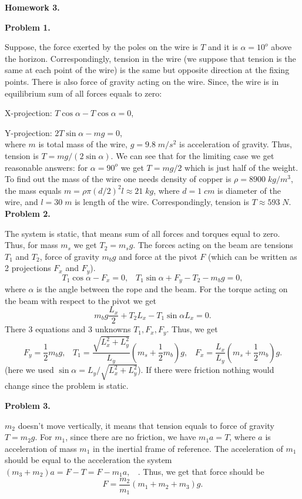 \documentclass[12pt]{article}
\begin{document}
\begin{center}
{\bf\large Homework 3.}
\end{center}

{\bf Problem 1.}

Suppose, the force exerted by the poles on the wire is $T$ and it is $\alpha=10^o$ above the horizon. Correspondingly, tension in the wire (we suppose that tension is the same at
each point of the wire) is the same but opposite direction at the fixing points. There is also force of gravity acting on the wire. Since, the wire is in equilibrium sum of all forces equals to zero:

X-projection: $T\cos\alpha-T\cos\alpha=0$,

Y-projection: $2T\sin\alpha-mg=0$,\\
where $m$ is total mass of the wire, $g=9.8\;m/s^2$ is acceleration of gravity.
Thus, tension is $T=mg/(2\sin\alpha)$. We can see that for the limiting case we get reasonable answers: for $\alpha=90^o$ we get $T=mg/2$ which is just half of the weight.
To find out the mass of the wire one needs density of copper is $\rho=8900\; kg/m^3$,
the mass equals $m=\rho \pi (d/2)^2 l\approx 21\;kg$, where $d=1\;cm$ is diameter of the wire, and $l=30\;m$ is length of the wire. Correspondingly, tension is $T\approx 593\;N$.
\\

{\bf Problem 2.}

The system is static, that means sum of all forces and torques equal to zero.
Thus, for mass $m_s$ we get $T_2=m_s g$.
The forces acting on the beam are tensions $T_1$ and $T_2$, force of gravity
$m_bg$ and force at the pivot $F$ (which can be written as 2 projections $F_x$ and $F_y$).
$$T_1 \cos\alpha -F_x=0,\;\;\; T_1 \sin\alpha+F_y-T_2-m_bg=0,$$
where $\alpha $ is the angle between the rope and  the beam.
For the torque acting on the beam with respect to the pivot we get
$$ m_b g \frac{L_x}{2} + T_2 L_x -T_1 \sin\alpha L_x=0.$$
There 3 equations and 3 unknowns $T_1, F_x, F_y$. Thus, we get 
$$F_y=\frac{1}{2}m_bg,\;\;\;T_1=\frac{\sqrt{L_x^2+L_y^2}}{L_y}(m_s+\frac{1}{2}m_b)g,\;\;\;F_x=\frac{L_x}{L_y}(m_s+\frac{1}{2}m_b)g.$$
(here we used $\sin\alpha=L_y/\sqrt{L_x^2+L_y^2}$). If there were friction nothing would
change since the problem is static.
\newpage

{\bf Problem 3.}

$m_2$ doesn't move vertically, it means that tension equals to force of gravity $T=m_2g$.
For $m_1$, since there are no friction, we have $m_1 a =T$, where $a$ is acceleration of mass $m_1$ in the inertial frame of reference. The acceleration of $m_1$ should be equal
to the acceleration the system $(m_3+m_2) a=F-T=F-m_1a,\;\;$ . Thus, we get that force should be
$$F=\frac{m_2}{m_1}(m_1+m_2+m_3)g.$$
\end{document}
